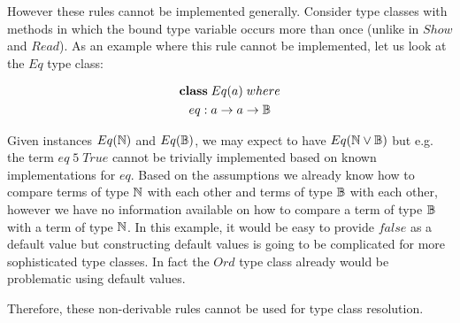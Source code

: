 However these rules cannot be implemented generally.
Consider type classes with methods in which the bound type variable occurs more than once (unlike in $Show$ and $Read$).
As an example where this rule cannot be implemented, let us look at the $Eq$ type class:

\begin{gather}
\nonumber {\bf class} \; Eq(a) \; where\\
\nonumber  eq : a \to a \to \mathbb{B}
\end{gather}

Given instances $Eq(\mathbb{N})$ and $Eq(\mathbb{B})$, we may expect to have $Eq(\mathbb{N} \vee \mathbb{B})$ but e.g. the term $eq \; 5 \; True$ cannot be trivially implemented based on known implementations for $eq$.
Based on the assumptions we already know how to compare terms of type $\mathbb{N}$ with each other and terms of type $\mathbb{B}$ with each other,
however we have no information available on how to compare a term of type $\mathbb{B}$ with a term of type $\mathbb{N}$.
In this example, it would be easy to provide $false$ as a default value but constructing default values is going to be complicated for more sophisticated type classes.
In fact the $Ord$ type class already would be problematic using default values.

Therefore, these non-derivable rules cannot be used for type class resolution.





